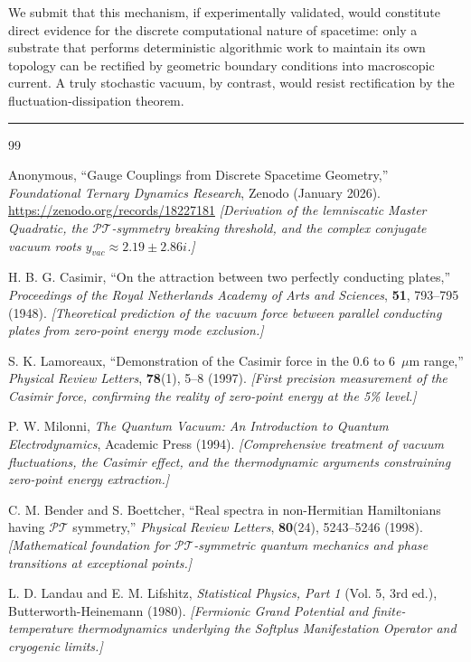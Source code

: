 \documentclass[11pt, letterpaper]{article}
\newcommand{\PT}{\mathcal{PT}}
\theoremstyle{definition}
\theoremstyle{remark}
\begin{document}
We submit that this mechanism, if experimentally validated, would constitute direct evidence for the discrete computational nature of spacetime: only a substrate that performs deterministic algorithmic work to maintain its own topology can be rectified by geometric boundary conditions into macroscopic current. A truly stochastic vacuum, by contrast, would resist rectification by the fluctuation-dissipation theorem.

\vspace{2em}
\hrule
\vspace{1.5em}

\begin{thebibliography}{99}

Anonymous,
``Gauge Couplings from Discrete Spacetime Geometry,''
\textit{Foundational Ternary Dynamics Research}, Zenodo (January 2026).
\url{https://zenodo.org/records/18227181}
\newblock \textit{[Derivation of the lemniscatic Master Quadratic, the $\PT$-symmetry breaking threshold, and the complex conjugate vacuum roots $y_{vac} \approx 2.19 \pm 2.86i$.]}

H. B. G. Casimir,
``On the attraction between two perfectly conducting plates,''
\textit{Proceedings of the Royal Netherlands Academy of Arts and Sciences}, \textbf{51}, 793--795 (1948).
\newblock \textit{[Theoretical prediction of the vacuum force between parallel conducting plates from zero-point energy mode exclusion.]}

S. K. Lamoreaux,
``Demonstration of the Casimir force in the 0.6 to 6~$\mu$m range,''
\textit{Physical Review Letters}, \textbf{78}(1), 5--8 (1997).
\newblock \textit{[First precision measurement of the Casimir force, confirming the reality of zero-point energy at the 5\% level.]}

P. W. Milonni,
\textit{The Quantum Vacuum: An Introduction to Quantum Electrodynamics},
Academic Press (1994).
\newblock \textit{[Comprehensive treatment of vacuum fluctuations, the Casimir effect, and the thermodynamic arguments constraining zero-point energy extraction.]}

C. M. Bender and S. Boettcher,
``Real spectra in non-Hermitian Hamiltonians having $\mathcal{PT}$ symmetry,''
\textit{Physical Review Letters}, \textbf{80}(24), 5243--5246 (1998).
\newblock \textit{[Mathematical foundation for $\PT$-symmetric quantum mechanics and phase transitions at exceptional points.]}

L. D. Landau and E. M. Lifshitz,
\textit{Statistical Physics, Part 1} (Vol. 5, 3rd ed.), Butterworth-Heinemann (1980).
\newblock \textit{[Fermionic Grand Potential and finite-temperature thermodynamics underlying the Softplus Manifestation Operator and cryogenic limits.]}


\end{thebibliography}
\end{document}
